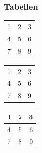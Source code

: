 \documentclass[a4paper, ngerman, oneside, 10pt]{article}
\begin{document}
\subsubsection{Tabellen}
\begin{tabular}{lcr}
	1 & 2 & 3 \\
	4 & 5 & 6 \\
	7 & 8 & 9 \\
\end{tabular}

\begin{tabular}{l|c|r}
	1 & 2 & 3 \\
	4 & 5 & 6 \\
	7 & 8 & 9 \\
\end{tabular}

\begin{center}
	\begin{tabular}{|l|c|r|}
		\hline
		1 & 2 & 3 \\
		\hline
		4 & 5 & 6 \\
		\hline
		7 & 8 & 9 \\
		\hline
	\end{tabular}
\end{center}
\end{document}
